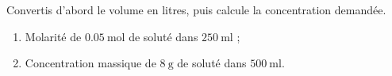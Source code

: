 \documentclass[11pt,a4paper]{article}
\begin{document}
\begin{exo}
Convertis d'abord le volume en litres, puis calcule la concentration demandée.
\begin{enumerate}[label=\alph*)]
  \item Molarité de $\SI{0.05}{\mole}$ de soluté dans $\SI{250}{\milli\litre}$ ;
  \item Concentration massique de $\SI{8}{\gram}$ de soluté dans $\SI{500}{\milli\litre}$.
\end{enumerate}
\end{exo}
\end{document}
